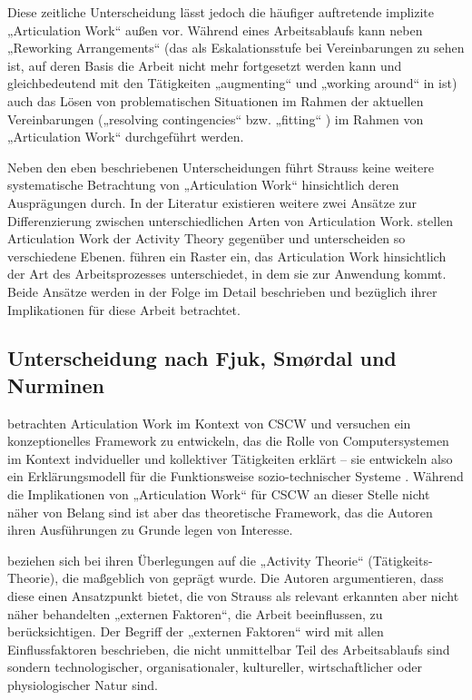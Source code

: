 Diese zeitliche Unterscheidung lässt jedoch die häufiger auftretende implizite „Articulation Work“ außen vor. Während eines Arbeitsablaufs kann neben „Reworking Arrangements“ (das als Eskalationsstufe bei Vereinbarungen zu sehen ist, auf deren Basis die Arbeit nicht mehr fortgesetzt werden kann und gleichbedeutend mit den Tätigkeiten „augmenting“ und „working around“ in \citep{Gasser86} ist) auch das Lösen von problematischen Situationen im Rahmen der aktuellen Vereinbarungen („resolving contingencies“ \citep{Gerson86} bzw. „fitting“ \citep{Gasser86}) im Rahmen von „Articulation Work“ durchgeführt werden.

Neben den eben beschriebenen Unterscheidungen führt Strauss keine weitere systematische Betrachtung von „Articulation Work“ hinsichtlich deren Ausprägungen durch. 
In der Literatur existieren weitere zwei Ansätze zur Differenzierung zwischen unterschiedlichen Arten von Articulation Work. \citet{Fjuk97} stellen Articulation Work der Activity Theory \citep{Leontev78} gegenüber und unterscheiden so verschiedene Ebenen. \citet{Hampson05} führen ein Raster ein, das Articulation Work hinsichtlich der Art des Arbeitsprozesses unterschiedet, in dem sie zur Anwendung kommt. Beide Ansätze werden in der Folge im Detail beschrieben und bezüglich ihrer Implikationen für diese Arbeit betrachtet.

\subsection{Unterscheidung nach Fjuk, Smørdal und Nurminen}
\label{sub:arten_fjuk}

\citet{Fjuk97} betrachten Articulation Work im Kontext von \gls{CSCW} und versuchen ein konzeptionelles Framework zu entwickeln, das die Rolle von Computersystemen im Kontext indvidueller und kollektiver Tätigkeiten erklärt -- sie entwickeln also ein Erklärungsmodell für die Funktionsweise sozio-technischer Systeme \citep{Emery60}. Während die Implikationen von „Articulation Work“ für \gls{CSCW} an dieser Stelle nicht näher von Belang sind ist aber das theoretische Framework, das die Autoren ihren Ausführungen zu Grunde legen von Interesse. 

\citet{Fjuk97} beziehen sich bei ihren Überlegungen auf die „Activity Theorie“ (Tätigkeits-Theorie), die maßgeblich von \citep{Leontev72} geprägt wurde. Die Autoren argumentieren, dass diese einen Ansatzpunkt bietet, die von Strauss als relevant erkannten aber nicht näher behandelten „externen Faktoren“, die Arbeit beeinflussen, zu berücksichtigen. Der Begriff der „externen Faktoren“ wird mit allen Einflussfaktoren beschrieben, die nicht unmittelbar Teil des Arbeitsablaufs sind sondern technologischer, organisationaler, kultureller, wirtschaftlicher oder physiologischer Natur sind. 

